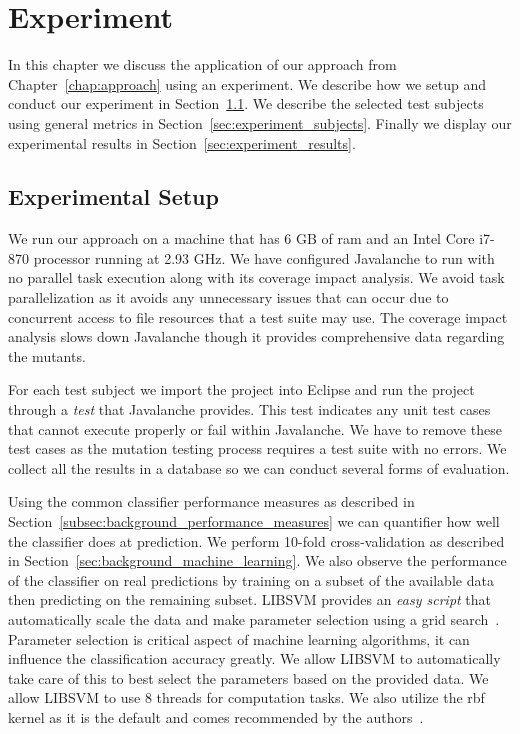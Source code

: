 \chapter{Experiment}
\label{chap:experiment}
In this chapter we discuss the application of our approach from Chapter~\ref{chap:approach} using an experiment. We describe how we setup and conduct our experiment in Section~\ref{sec:experiment_setup}. We describe the selected test subjects using general metrics in Section~\ref{sec:experiment_subjects}. Finally we display our experimental results in Section~\ref{sec:experiment_results}.


\section{Experimental Setup}
\label{sec:experiment_setup}
We run our approach on a machine that has 6 GB of \gls{ram} and an Intel Core i7-870 processor running at 2.93 GHz. We have configured Javalanche to run with no parallel task execution along with its coverage impact analysis. We avoid task parallelization as it avoids any unnecessary issues that can occur due to concurrent access to file resources that a test suite may use. The coverage impact analysis slows down Javalanche though it provides comprehensive data regarding the mutants.

For each test subject we import the project into Eclipse and run the project through a \emph{test} that Javalanche provides. This test indicates any unit test cases that cannot execute properly or fail within Javalanche. We have to remove these test cases as the mutation testing process requires a test suite with no errors. We collect all the results in a database so we can conduct several forms of evaluation.

Using the common classifier performance measures as described in Section~\ref{subsec:background_performance_measures} we can quantifier how well the classifier does at prediction. We perform 10-fold cross-validation as described in Section~\ref{sec:background_machine_learning}. We also observe the performance of the classifier on real predictions by training on a subset of the available data then predicting on the remaining subset. LIBSVM provides an \emph{easy script} that automatically scale the data and make parameter selection using a grid search~\cite{HCL03}. Parameter selection is critical aspect of machine learning algorithms, it can influence the classification accuracy greatly. We allow LIBSVM to automatically take care of this to best select the parameters based on the provided data. We allow LIBSVM to use 8 threads for computation tasks. We also utilize the \gls{rbf} kernel as it is the default and comes recommended by the authors~\cite{HCL03}.


